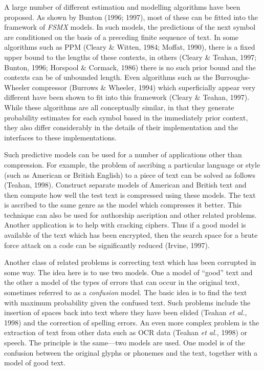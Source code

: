 \documentclass[11pt]{article}
\begin{document}
A large number of different estimation and modelling algorithms have been
proposed. As shown by Bunton (1996; 1997), most of these can be fitted into
the framework of \emph{FSMX} models. In such models, the predictions of the
next symbol are conditioned on the basis of a preceding finite sequence of
text. In some algorithms such as PPM (Cleary \& Witten, 1984; Moffat,
1990), there is a fixed upper bound to the lengths of these contexts, in
others (Cleary \& Teahan, 1997; Bunton, 1996; Horspool \& Cormack, 1986)
there is no such prior bound and the contexts can be of unbounded
length. Even algorithms such as the Burroughs-Wheeler compressor (Burrows
\& Wheeler, 1994) which superficially appear very different have been shown
to fit into this framework (Cleary \& Teahan, 1997). While these algorithms
are all conceptually similar, in that they generate probability estimates
for each symbol based in the immediately prior context, they also differ
considerably in the details of their implementation and the interfaces to
these implementations.

Such predictive models can be used for a number of applications other than
compression. For example, the problem of ascribing a particular language or
style (such as American or British English) to a piece of text can be solved
as follows (Teahan, 1998). Construct separate models of American and British
text and then compute how well the test text is compressed using these
models. The text is ascribed to the same genre as the model which compresses
it better. This technique can also be used for authorship ascription and
other related problems. Another application is to help with cracking
ciphers. Thus if a good model is available of the text which has been
encrypted, then the search space for a brute force attack on a code can be
significantly reduced (Irvine, 1997).

Another class of related problems is correcting text which has been
corrupted in some way. The idea here is to use two models. One a model of
``good'' text and the other a model of the types of errors that can occur in
the original text, sometimes referred to as a \emph{confusion} model. The
basic idea is to find the text with maximum probability given the confused
text. Such problems include the insertion of spaces back into text where
they have been elided (Teahan \emph{et al.}, 1998) and the correction of
spelling errors. An even more complex problem is the extraction of text from
other data such as OCR data (Teahan \emph{et al.}, 1998) or speech. The
principle is the same---two models are used. One model is of the confusion
between the original glyphs or phonemes and the text, together with a model of
good text.
\end{document}
